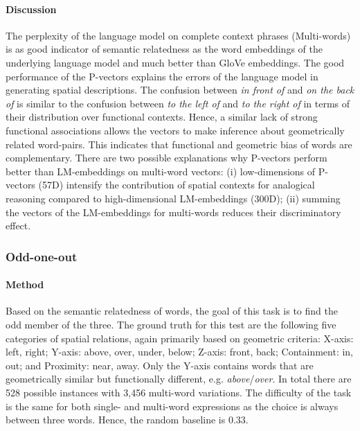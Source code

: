 \paragraph{Discussion} The perplexity of the language model on complete context
phrases (Multi-words) is as good indicator of semantic relatedness as the word embeddings of
the underlying language model and much better than GloVe embeddings. The good
performance of the P-vectors explains the errors of the language model in
generating spatial descriptions. The confusion between \emph{in front of} and
\emph{on the back of} is similar to the confusion between \emph{to the left of}
and \emph{to the right of} in terms of their distribution over functional
contexts. Hence, a similar lack of strong functional associations allows the
vectors to make inference about geometrically related word-pairs. This
indicates that functional and geometric bias of words are complementary. There
are two possible explanations why P-vectors perform better than LM-embeddings
on multi-word vectors: (i) low-dimensions of P-vectors (57D) intensify the
contribution of spatial contexts for analogical reasoning compared to
high-dimensional LM-embeddings (300D); (ii) summing the vectors of the
LM-embeddings for multi-words reduces their discriminatory effect.

\subsubsection{Odd-one-out}

\paragraph{Method}
Based on the semantic relatedness of words, the goal of this task is to find
the odd member of the three.
The ground truth for this test are the following five categories of spatial
relations, again primarily based on geometric criteria:
X-axis: left, right; Y-axis: above, over, under, below; Z-axis: front, back;
Containment: in, out; and Proximity: near, away.
Only the Y-axis contains words that are geometrically similar but functionally
different, e.g. \emph{above}/\emph{over}.
In total there are 528 possible instances with 3,456 multi-word variations. The
difficulty of the task is the same for both single- and multi-word expressions as the choice is always
between three words. Hence, the random baseline is $0.33$.






